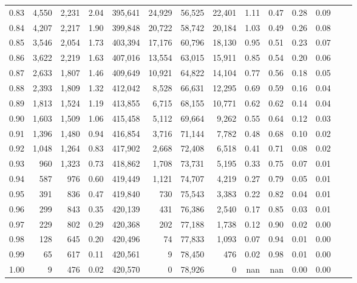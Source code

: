 \begin{tabular}{rrrrrrrrrrrrrr}
0.83 &  4,550 &  2,231 &     2.04 &  395,641 &   24,929 &  56,525 &  22,401 &  1.11 &  0.47 &  0.28 &      0.09 \\
0.84 &  4,207 &  2,217 &     1.90 &  399,848 &   20,722 &  58,742 &  20,184 &  1.03 &  0.49 &  0.26 &      0.08 \\
0.85 &  3,546 &  2,054 &     1.73 &  403,394 &   17,176 &  60,796 &  18,130 &  0.95 &  0.51 &  0.23 &      0.07 \\
0.86 &  3,622 &  2,219 &     1.63 &  407,016 &   13,554 &  63,015 &  15,911 &  0.85 &  0.54 &  0.20 &      0.06 \\
0.87 &  2,633 &  1,807 &     1.46 &  409,649 &   10,921 &  64,822 &  14,104 &  0.77 &  0.56 &  0.18 &      0.05 \\
0.88 &  2,393 &  1,809 &     1.32 &  412,042 &    8,528 &  66,631 &  12,295 &  0.69 &  0.59 &  0.16 &      0.04 \\
0.89 &  1,813 &  1,524 &     1.19 &  413,855 &    6,715 &  68,155 &  10,771 &  0.62 &  0.62 &  0.14 &      0.04 \\
0.90 &  1,603 &  1,509 &     1.06 &  415,458 &    5,112 &  69,664 &   9,262 &  0.55 &  0.64 &  0.12 &      0.03 \\
0.91 &  1,396 &  1,480 &     0.94 &  416,854 &    3,716 &  71,144 &   7,782 &  0.48 &  0.68 &  0.10 &      0.02 \\
0.92 &  1,048 &  1,264 &     0.83 &  417,902 &    2,668 &  72,408 &   6,518 &  0.41 &  0.71 &  0.08 &      0.02 \\
0.93 &    960 &  1,323 &     0.73 &  418,862 &    1,708 &  73,731 &   5,195 &  0.33 &  0.75 &  0.07 &      0.01 \\
0.94 &    587 &    976 &     0.60 &  419,449 &    1,121 &  74,707 &   4,219 &  0.27 &  0.79 &  0.05 &      0.01 \\
0.95 &    391 &    836 &     0.47 &  419,840 &      730 &  75,543 &   3,383 &  0.22 &  0.82 &  0.04 &      0.01 \\
0.96 &    299 &    843 &     0.35 &  420,139 &      431 &  76,386 &   2,540 &  0.17 &  0.85 &  0.03 &      0.01 \\
0.97 &    229 &    802 &     0.29 &  420,368 &      202 &  77,188 &   1,738 &  0.12 &  0.90 &  0.02 &      0.00 \\
0.98 &    128 &    645 &     0.20 &  420,496 &       74 &  77,833 &   1,093 &  0.07 &  0.94 &  0.01 &      0.00 \\
0.99 &     65 &    617 &     0.11 &  420,561 &        9 &  78,450 &     476 &  0.02 &  0.98 &  0.01 &      0.00 \\
1.00 &      9 &    476 &     0.02 &  420,570 &        0 &  78,926 &       0 &   nan &   nan &  0.00 &      0.00 \\
\bottomrule
\end{tabular}
